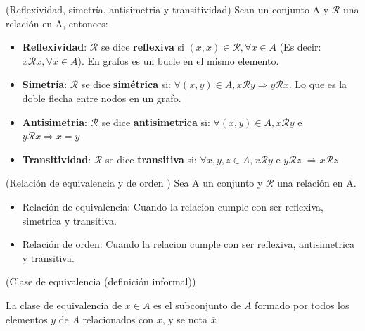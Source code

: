 \documentclass[10pt]{article}
\begin{document}
\begin{defi}(Reflexividad, simetría, antisimetria y transitividad)
Sean un conjunto A  y $\mathcal{R}$ una relación en A, entonces:
\begin{itemize}
	\item \textbf{Reflexividad}: $\mathcal{R}$ se dice \textbf{reflexiva} si $(x,x) \in \mathcal{R}, \forall x \in A$ (Es decir: $x \mathcal{R} x, \forall x \in A$). En grafos es un bucle en el mismo elemento.
	\item \textbf{Simetría}: $\mathcal{R}$ se dice \textbf{simétrica} si: $\forall (x,y) \in A, x \mathcal{R} y \Rightarrow y \mathcal{R} x$. Lo que es la doble flecha entre nodos en un grafo.
	\item \textbf{Antisimetria}: $\mathcal{R}$ se dice \textbf{antisimetrica} si: $\forall (x,y) \in A,  x \mathcal{R} y$ e $y \mathcal{R} x \Rightarrow x = y$
	\item \textbf{Transitividad}: $\mathcal{R}$ se dice \textbf{transitiva} si: $ \forall x,y,z \in A, x \mathcal{R} y $ e $y \mathcal{R} z$ $\Rightarrow  x \mathcal{R} z$
\end{itemize}
\end{defi}

\begin{defi}(Relación de equivalencia y de orden )
Sea A un conjunto y $\mathcal{R}$ una relación en A. 
\begin{itemize}
	\item Relación de equivalencia: Cuando la relacion cumple con ser reflexiva, simetrica y transitiva.
	\item Relación de orden: Cuando la relacion cumple con ser reflexiva, antisimetrica y transitiva.
\end{itemize}
\end{defi}

\begin{defi}(Clase de equivalencia (definición informal))

La clase de equivalencia de $x \in A$ es el subconjunto de $A$ formado por todos los elementos $y$ de $A$ relacionados con $x$, y se nota $\overline{x}$
\end{defi}
\end{document}
